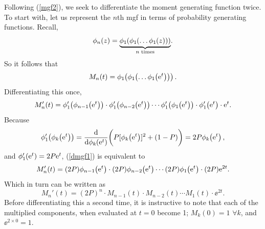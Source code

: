 Following (\ref{mgf2}), we seek to differentiate the moment generating function twice. To start with, let us represent the $n$th mgf in terms of probability generating functions. Recall,
$$\phi_n(z) = \underset{n \text{ times}}{\underbrace{ \phi_{1}\hspace{-2pt}\left(\phi_1\hspace{-2pt}\left(\dots\phi_1\hspace{-2pt}\left( z\right)\right)\right)    }}.$$  
So it follows that 
$$M_n(t) = \phi_1\hspace{-2pt}\left(\phi_1\hspace{-2pt}\left(\dots\phi_1\hspace{-2pt}\left({\rm e}^t\right)\right)\right).$$
Differentiating this once, 
\begin{equation}
\label{dmgf1}
M_n'(t) = \phi_1'\hspace{-2pt}\left(\phi_{n-1}\hspace{-2pt}\left({\rm e}^t\right)\right)  \cdot  \phi_1'\hspace{-2pt}\left(\phi_{n-2}\hspace{-2pt}\left({\rm e}^t\right)\right)  \cdots   \phi_1'\hspace{-2pt}\left(\phi_{1}\hspace{-2pt}\left({\rm e}^t\right)\right) \cdot \phi_1'\hspace{-2pt}\left({\rm e}^t\right) \cdot{\rm e}^t.
\end{equation}
Because 
$$\phi_1'\hspace{-2pt}\left(\phi_k\hspace{-2pt}\left({\rm e}^t\right)\right) = \frac{{\rm d}}{{\rm d} \phi_k\hspace{-2pt}\left({\rm e}^t\right)}\bigg(P[\phi_k\hspace{-2pt}\left({\rm e}^t\right)]^2 + (1-P)\bigg) = 2P \phi_k\hspace{-2pt}\left({\rm e}^t\right),$$
and $\phi_1'\hspace{-2pt}\left({\rm e}^t\right) = 2P{\rm e}^t$, (\ref{dmgf1}) is equivalent to 
$$M_n'(t) = (2P)\phi_{n-1}\hspace{-2pt}\left({\rm e}^t\right)  \cdot  (2P)\phi_{n-2}\hspace{-2pt}\left({\rm e}^t\right) \cdots (2P)\phi_{1}\hspace{-2pt}\left({\rm e}^t\right) \cdot (2P){\rm e}^{2t}.$$
Which in turn can be written as
\begin{equation}
\label{dmgf2}
M_n'(t) = (2P)^n \cdot M_{n-1}(t)  \cdot  M_{n-2}(t)  \cdots M_{1}(t)  \cdot \ee^{2t}.
\end{equation}
Before differentiating this a second time, it is instructive to note that each of the multiplied components, when evaluated at $t=0$ become 1; $M_k(0) = 1$ $\forall k$, and $\ee^{2\times 0} = 1$. 

